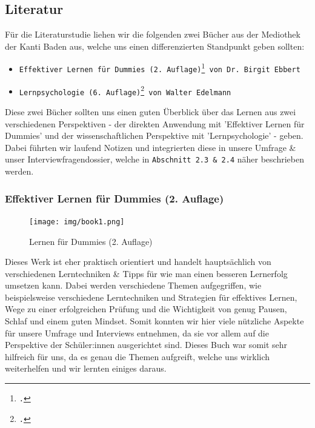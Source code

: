 \documentclass[12pt,a4paper]{report}
\begin{document}
\subsection{Literatur}
Für die Literaturstudie liehen wir die folgenden zwei Bücher aus der Mediothek der Kanti Baden aus, welche uns einen differenzierten Standpunkt geben sollten:
\begin{itemize}{}
    \item \texttt{Effektiver Lernen für Dummies (2. Auflage)\footcite{Book1} von Dr. Birgit Ebbert}
    \item \texttt{Lernpsychologie (6. Auflage)\footcite{Book2} von Walter Edelmann}
    
\end{itemize}
Diese zwei Bücher sollten uns einen guten Überblick über das Lernen aus zwei verschiedenen Perspektiven - der direkten Anwendung mit 'Effektiver Lernen für Dummies' und der wissenschaftlichen Perspektive mit 'Lernpsychologie' - geben. 
Dabei führten wir laufend Notizen und integrierten diese in unsere Umfrage \& unser Interviewfragendossier, welche in \texttt{Abschnitt 2.3 \& 2.4} näher beschrieben werden.

\subsubsection{Effektiver Lernen für Dummies (2. Auflage)}
\begin{figure}[H]
    \centering
    \texttt{[image: img/book1.png]}
    \caption{Lernen für Dummies (2. Auflage)}
\end{figure}

Dieses Werk ist eher praktisch orientiert und handelt hauptsächlich von verschiedenen Lerntechniken \& Tipps für wie man einen besseren Lernerfolg umsetzen kann. 
Dabei werden verschiedene Themen aufgegriffen, wie beispielsweise verschiedene Lerntechniken und Strategien für effektives Lernen, Wege zu einer erfolgreichen Prüfung und die Wichtigkeit von genug Pausen, Schlaf und einem guten Mindset.
Somit konnten wir hier viele nützliche Aspekte für unsere Umfrage und Interviews entnehmen, da sie vor allem auf die Perspektive der Schüler:innen ausgerichtet sind. 
Dieses Buch war somit sehr hilfreich für uns, da es genau die Themen aufgreift, welche uns wirklich weiterhelfen und wir lernten einiges daraus.
\end{document}

